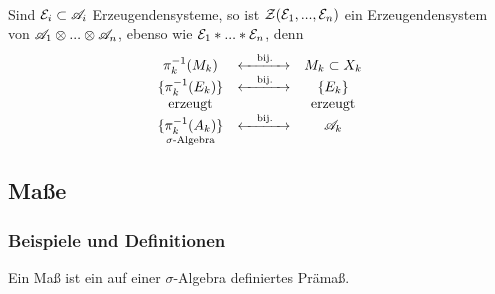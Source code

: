 \vspace{0.5pc}\\
Sind $\EE_i \subset \AA_i$ Erzeugendensysteme, so ist $\ZZ(\EE_1,...,\EE_n)$ ein Erzeugendensystem von $\AA_1 \otimes ... \otimes \AA_n$, ebenso wie $\EE_1 \ast ... \ast \EE_n$, denn
\begin{equation*}
	\begin{array}{ccc}
		\pi_k^{-1}(M_k) & \xleftrightarrow{\quad\text{bij.}\quad} & M_k \subset X_k \\
		\{ \pi^{-1}_k(E_k) \} & \xleftrightarrow{\quad\text{bij.}\quad} & \{E_k\} \\
		\text{erzeugt} & &\text{erzeugt} \\
		\underset{\sigma\text{-Algebra}}{\{\pi_k^{-1}(A_k)\}} & \xleftrightarrow{\quad\text{bij.}\quad}  & \AA_k
	\end{array}
\end{equation*}
\subsection{Maße}
\subsubsection{Beispiele und Definitionen}
\begin{definition}
\begin{mdframed}
Ein Maß ist ein auf einer $\sigma$-Algebra definiertes Prämaß.
\end{mdframed}
\end{definition}

